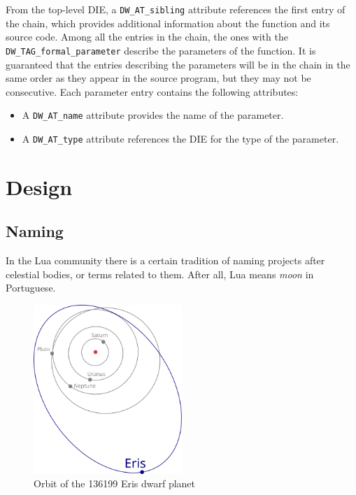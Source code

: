 From the top-level DIE, a \verb|DW_AT_sibling| attribute references the first
entry of the chain, which provides additional information about the function
and its source code. Among all the entries in the chain, the ones with the
\verb|DW_TAG_formal_parameter| describe the parameters of the function. It is
guaranteed that the entries describing the parameters will be in the chain in
the same order as they appear in the source program, but they may not be
consecutive. Each parameter entry contains the following attributes:

\begin{itemize}
  \item A \verb|DW_AT_name| attribute provides the name of the parameter.
  \item A \verb|DW_AT_type| attribute references the DIE for the type of
    the parameter.
\end{itemize}



\section{Design}


\subsection{Naming}

In the Lua community there is a certain tradition of naming projects after
celestial bodies, or terms related to them. After all, Lua means \emph{moon}
in Portuguese.

\begin{figure}[H]
  \centering
  \includegraphics[width=0.5\textwidth]{img/eris-orbit}
  \caption{Orbit of the 136199 Eris dwarf planet}
  \label{fig:eris-orbit}
\end{figure}


